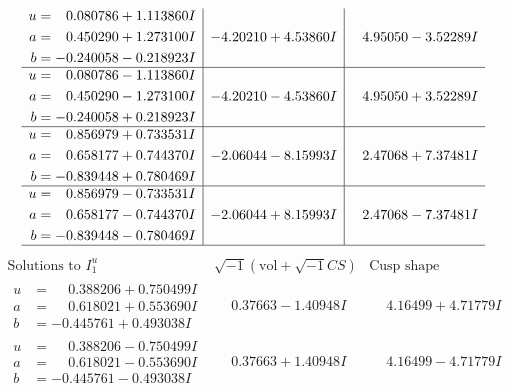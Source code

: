 \documentclass[1p]{elsarticle_modified}
\theoremstyle{definition}
\newcommand{\I}{\sqrt{-1}}
\begin{document}
$$\begin{array}{c|c|c}
\begin{aligned}
u &= \phantom{-}0.080786 + 1.113860 I \\
a &= \phantom{-}0.450290 + 1.273100 I \\
b &= -0.240058 - 0.218923 I\end{aligned}
 & -4.20210 + 4.53860 I & \phantom{-}4.95050 - 3.52289 I \\ \hline\begin{aligned}
u &= \phantom{-}0.080786 - 1.113860 I \\
a &= \phantom{-}0.450290 - 1.273100 I \\
b &= -0.240058 + 0.218923 I\end{aligned}
 & -4.20210 - 4.53860 I & \phantom{-}4.95050 + 3.52289 I \\ \hline\begin{aligned}
u &= \phantom{-}0.856979 + 0.733531 I \\
a &= \phantom{-}0.658177 + 0.744370 I \\
b &= -0.839448 + 0.780469 I\end{aligned}
 & -2.06044 - 8.15993 I & \phantom{-}2.47068 + 7.37481 I \\ \hline\begin{aligned}
u &= \phantom{-}0.856979 - 0.733531 I \\
a &= \phantom{-}0.658177 - 0.744370 I \\
b &= -0.839448 - 0.780469 I\end{aligned}
 & -2.06044 + 8.15993 I & \phantom{-}2.47068 - 7.37481 I\\
 \hline 
 \end{array}$$\newpage$$\begin{array}{c|c|c}  
\text{Solutions to }I^u_{1}& \I (\text{vol} + \sqrt{-1}CS) & \text{Cusp shape}\\
 \hline 
\begin{aligned}
u &= \phantom{-}0.388206 + 0.750499 I \\
a &= \phantom{-}0.618021 + 0.553690 I \\
b &= -0.445761 + 0.493038 I\end{aligned}
 & \phantom{-}0.37663 - 1.40948 I & \phantom{-}4.16499 + 4.71779 I \\ \hline\begin{aligned}
u &= \phantom{-}0.388206 - 0.750499 I \\
a &= \phantom{-}0.618021 - 0.553690 I \\
b &= -0.445761 - 0.493038 I\end{aligned}
 & \phantom{-}0.37663 + 1.40948 I & \phantom{-}4.16499 - 4.71779 I \\ \hline\begin{aligned}

\end{aligned}
\end{array}$$
\end{document}
